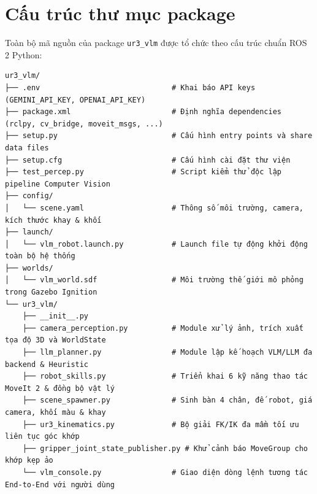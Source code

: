 \documentclass[a4paper,12pt]{article}
\begin{document}
\section{Cấu trúc thư mục package}
Toàn bộ mã nguồn của package \texttt{ur3\_vlm} được tổ chức theo cấu trúc chuẩn ROS 2 Python:
\begin{verbatim}
ur3_vlm/
├── .env                              # Khai báo API keys (GEMINI_API_KEY, OPENAI_API_KEY)
├── package.xml                       # Định nghĩa dependencies (rclpy, cv_bridge, moveit_msgs, ...)
├── setup.py                          # Cấu hình entry points và share data files
├── setup.cfg                         # Cấu hình cài đặt thư viện
├── test_percep.py                    # Script kiểm thử độc lập pipeline Computer Vision
├── config/
│   └── scene.yaml                    # Thông số môi trường, camera, kích thước khay & khối
├── launch/
│   └── vlm_robot.launch.py           # Launch file tự động khởi động toàn bộ hệ thống
├── worlds/
│   └── vlm_world.sdf                 # Môi trường thế giới mô phỏng trong Gazebo Ignition
└── ur3_vlm/
    ├── __init__.py
    ├── camera_perception.py          # Module xử lý ảnh, trích xuất tọa độ 3D và WorldState
    ├── llm_planner.py                # Module lập kế hoạch VLM/LLM đa backend & Heuristic
    ├── robot_skills.py               # Triển khai 6 kỹ năng thao tác MoveIt 2 & đồng bộ vật lý
    ├── scene_spawner.py              # Sinh bàn 4 chân, đế robot, giá camera, khối màu & khay
    ├── ur3_kinematics.py             # Bộ giải FK/IK đa mầm tối ưu liên tục góc khớp
    ├── gripper_joint_state_publisher.py # Khử cảnh báo MoveGroup cho khớp kẹp ảo
    └── vlm_console.py                # Giao diện dòng lệnh tương tác End-to-End với người dùng
\end{verbatim}
\end{document}
